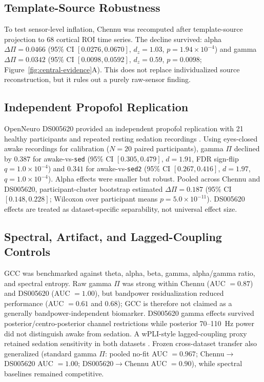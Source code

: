 \documentclass[11pt,a4paper]{article}
\theoremstyle{plain}
\theoremstyle{definition}
\theoremstyle{remark}
\begin{document}
\subsection{Template-Source Robustness}
\label{sec:source-robustness}

To test sensor-level inflation, Chennu was recomputed after template-source projection to 68 cortical ROI time series. The decline survived: alpha $\Delta\Pi=0.0466$ (95\% CI $[0.0276,0.0670]$, $d_z=1.03$, $p=1.94\times10^{-4}$) and gamma $\Delta\Pi=0.0342$ (95\% CI $[0.0098,0.0592]$, $d_z=0.59$, $p=0.0098$; Figure~\ref{fig:central-evidence}A). This does not replace individualized source reconstruction, but it rules out a purely raw-sensor finding.

\subsection{Independent Propofol Replication}
\label{sec:ds005620}

OpenNeuro DS005620 provided an independent propofol replication with 21 healthy participants and repeated resting sedation recordings \citep{bajwa2024ds005620}. Using eyes-closed awake recordings for calibration ($N=20$ paired participants), gamma $\Pi$ declined by $0.387$ for awake-vs-\texttt{sed} (95\% CI $[0.305,0.479]$, $d=1.91$, FDR sign-flip $q=1.0\times10^{-4}$) and $0.341$ for awake-vs-\texttt{sed2} (95\% CI $[0.267,0.416]$, $d=1.97$, $q=1.0\times10^{-4}$). Alpha effects were smaller but robust. Pooled across Chennu and DS005620, participant-cluster bootstrap estimated $\Delta\Pi=0.187$ (95\% CI $[0.148,0.228]$; Wilcoxon over participant means $p=5.0\times10^{-11}$). DS005620 effects are treated as dataset-specific separability, not universal effect size.

\subsection{Spectral, Artifact, and Lagged-Coupling Controls}
\label{sec:spectral-controls}

GCC was benchmarked against theta, alpha, beta, gamma, alpha/gamma ratio, and spectral entropy. Raw gamma $\Pi$ was strong within Chennu (AUC $=0.87$) and DS005620 (AUC $=1.00$), but bandpower residualization reduced performance (AUC $=0.61$ and $0.68$); GCC is therefore not claimed as a generally bandpower-independent biomarker. DS005620 gamma effects survived posterior/centro-posterior channel restrictions while posterior 70--110~Hz power did not distinguish awake from sedation. A wPLI-style lagged-coupling proxy retained sedation sensitivity in both datasets \citep{vinck2011}. Frozen cross-dataset transfer also generalized (standard gamma $\Pi$: pooled no-fit AUC $=0.967$; Chennu$\to$DS005620 AUC $=1.00$; DS005620$\to$Chennu AUC $=0.90$), while spectral baselines remained competitive.
\end{document}
